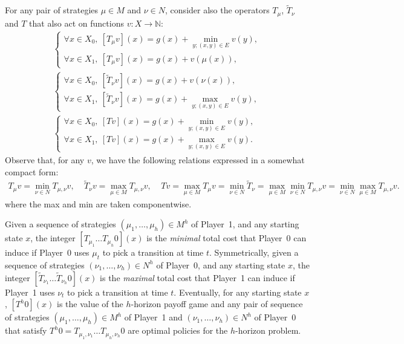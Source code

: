 \documentclass{article}
\def\N{\mathbb N}
\def\pa{Player~0}
\def\pb{Player~1}
\begin{document}
For any pair of strategies $\mu \in M$ and $\nu \in N$, consider also the operators $T_\mu$, $\tilde T_\nu$ and $T$ that also act on functions $v:X \to \N$:
\begin{align}
  \left\{\begin{array}{l}
  \forall x \in X_0,~ [T_{\mu}v](x)= g(x) + \min_{y;(x,y) \in E} v(y), \\
  \forall x \in X_1,~ [T_{\mu}v](x)= g(x) + v(\mu(x)),
  \end{array}\right. \\
  \left\{\begin{array}{l}
  \forall x \in X_0,~ [\tilde T_{\nu}v](x) = g(x) + v(\nu(x)), \\
  \forall x \in X_1,~ [\tilde T_{\nu}v](x) = g(x) + \max_{y;(x,y) \in E} v(y),
  \end{array}\right. \\
  \left\{\begin{array}{l}
  \forall x \in X_0,~ [T v](x) = g(x) + \min_{y;(x,y) \in E} v(y), \\
  \forall x \in X_1,~ [T v](x) = g(x) + \max_{y;(x,y) \in E} v(y).
  \end{array}\right. 
\end{align}
Observe that, for any $v$,  we have the following relations expressed in a somewhat compact form:
\begin{align}
  T_{\mu} v = \min_{\nu \in N} T_{\mu,\nu}v, ~~~~~
  \tilde T_{\nu} v = \max_{\mu \in M} T_{\mu,\nu}v, ~~~~~
  T v = \max_{\mu \in M} T_{\mu}v = \min_{\nu \in N} \tilde T_{\nu} = \max_{\mu \in M}\min_{\nu \in N}T_{\mu,\nu}v = \min_{\nu \in N}\max_{\mu \in M}T_{\mu,\nu}v.
\end{align}
where the max and min are taken componentwise.

Given a sequence of strategies $(\mu_1,\dots,\mu_h) \in M^h$ of \pb, and any starting state $x$, the integer $[T_{\mu_1} \dots T_{\mu_h}0](x)$ is the \emph{minimal} total cost that \pa{ }can induce if \pa{ }uses $\mu_t$ to pick a transition at time $t$. Symmetrically, given a sequence of strategies $(\nu_1,\dots,\nu_h) \in N^h$ of \pa, and any starting state $x$, the integer $[\tilde T_{\nu_1} \dots \tilde T_{\nu_h}0](x)$ is the \emph{maximal} total cost that \pb{ }can induce if \pb{ }uses $\nu_t$ to pick a transition at time $t$. Eventually, for any starting state $x$, $[T^h 0](x)$ is the value of the $h$-horizon payoff game and any pair of sequence of strategies $(\mu_1,\dots,\mu_h) \in M^h$ of \pb{ }and $(\nu_1,\dots,\nu_h) \in N^h$ of \pa{ }that satisfy $T^h 0=T_{\mu_1,\nu_1} \dots T_{\mu_h,\nu_h}0$ are optimal policies for the $h$-horizon problem.
\end{document}
